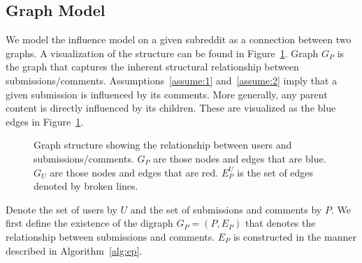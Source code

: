 \documentclass[letterpaper, 10 pt, conference]{ieeeconf}
\theoremstyle{plain}
\begin{document}
\subsection{Graph Model}
We model the influence model on a given subreddit as a connection between two graphs. A visualization of the structure can be found in Figure~\ref{fig:model:hypergraph}. Graph \(G_P\) is the graph that captures the inherent structural relationship between submissions/comments. Assumptions~\ref{assume:1} and~\ref{assume:2} imply that a given submission is influenced by its comments. More generally, any parent content is directly influenced by its children. These are visualized as the blue edges in Figure~\ref{fig:model:hypergraph}.

\begin{figure}
  \centering
  \caption{Graph structure showing the relationship between users and submissions/comments. \(G_P\) are those nodes and edges that are blue. \(G_U\) are those nodes and edges that are red. \(E_P^U\) is the set of edges denoted by broken lines.}
  \label{fig:model:hypergraph}
\end{figure}
Denote the set of users by \(U\) and the set of submissions and comments by \(P.\) We first define the existence of the digraph \(G_P=(P,E_P)\) that denotes the relationship between submissions and comments. \(E_P\) is constructed in the manner described in Algorithm~\ref{alg:ep}.
\end{document}
